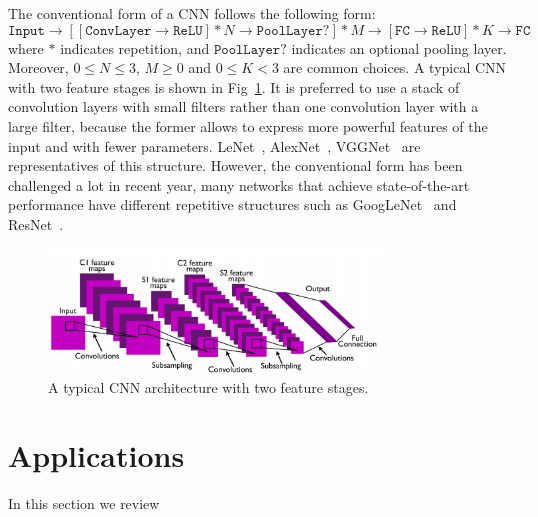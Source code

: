 The conventional form of a CNN follows the following form:
$$\mathtt{Input} \rightarrow [[\mathtt{ConvLayer} \rightarrow \mathtt{ReLU}] * N \rightarrow \mathtt{PoolLayer}?]*M \rightarrow [\mathtt{FC}\rightarrow \mathtt{ReLU}]*K \rightarrow \mathtt{FC}$$
where $*$ indicates repetition, and $\mathtt{PoolLayer}?$ indicates an optional pooling layer. Moreover, $0 \leq N \leq 3$, $M \geq 0$ and $0 \leq K < 3$ are common choices. A typical CNN with two feature stages is shown in Fig~\ref{fig:ch3-typicalcnn}. It is preferred to use a stack of convolution layers with small filters rather than one convolution layer with a large filter, because the former allows to express more powerful features of the input and with fewer parameters. LeNet~\cite{lecun1998gradient}, AlexNet~\cite{krizhevsky2012imagenet}, VGGNet~\cite{SimonyanZ14a} are representatives of this structure. However, the conventional form has been challenged a lot in recent year, many networks that achieve state-of-the-art performance have different repetitive structures such as GoogLeNet~\cite{szegedy2015going} and ResNet~\cite{kmhresnet15}.

\begin{figure}[!htbp]
    \centering
    \includegraphics[width=0.8\textwidth]{figure/ch3-typicalcnn.png}
    \caption{A typical CNN architecture with two feature stages.}
    \label{fig:ch3-typicalcnn}
\end{figure}

\section{Applications}

In this section we review 


\newpage
